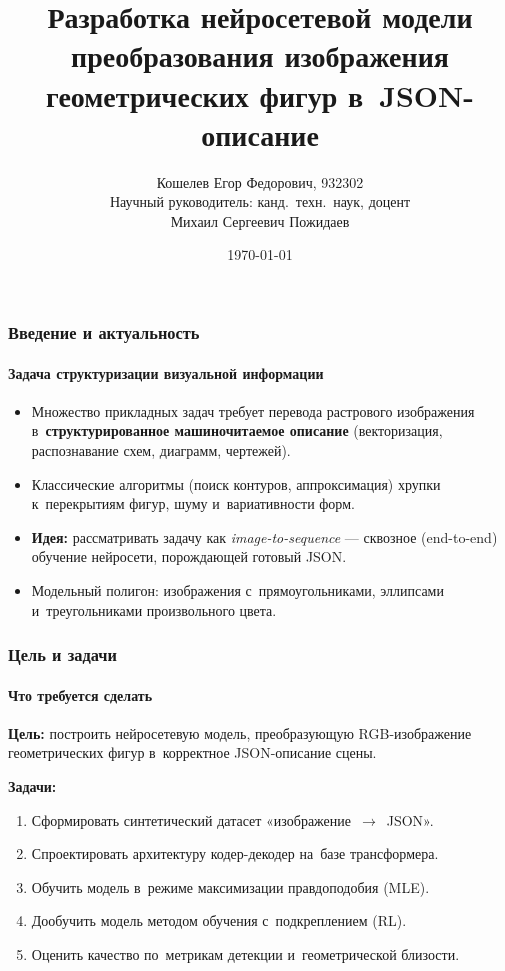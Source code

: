 \documentclass{beamer}
\title{Разработка нейросетевой модели преобразования изображения геометрических фигур в~JSON-описание}
\author[Кошелев Е.\,Ф.]{Кошелев Егор Федорович, 932302 \\ \vspace{0.5em} {\small Научный руководитель: канд.~техн.~наук, доцент \\ Михаил Сергеевич Пожидаев}}
\date{\today}
\begin{document}
\maketitle

\begin{frame}
\frametitle{Введение и актуальность}
\framesubtitle{Задача структуризации визуальной информации}
\begin{itemize}
  \item Множество прикладных задач требует перевода растрового изображения в~\textbf{структурированное машиночитаемое описание} (векторизация, распознавание схем, диаграмм, чертежей).
  \item Классические алгоритмы (поиск контуров, аппроксимация) хрупки к~перекрытиям фигур, шуму и~вариативности форм.
  \item \textbf{Идея:} рассматривать задачу как \emph{image-to-sequence} --- сквозное (end-to-end) обучение нейросети, порождающей готовый JSON.
  \item Модельный полигон: изображения с~прямоугольниками, эллипсами и~треугольниками произвольного цвета.
\end{itemize}
\end{frame}

\begin{frame}
\frametitle{Цель и задачи}
\framesubtitle{Что требуется сделать}
\textbf{Цель:} построить нейросетевую модель, преобразующую RGB-изображение геометрических фигур в~корректное JSON-описание сцены.

\medskip
\textbf{Задачи:}
\begin{enumerate}
  \item Сформировать синтетический датасет «изображение~$\to$~JSON».
  \item Спроектировать архитектуру кодер-декодер на~базе трансформера.
  \item Обучить модель в~режиме максимизации правдоподобия (MLE).
  \item Дообучить модель методом обучения с~подкреплением (RL).
  \item Оценить качество по~метрикам детекции и~геометрической близости.
\end{enumerate}
\end{frame}
\end{document}
